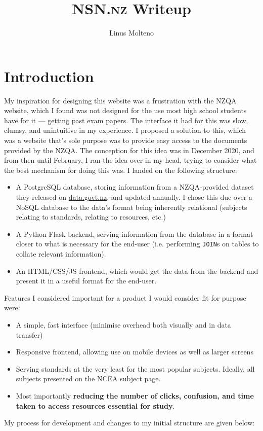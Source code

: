 \documentclass{article}
\title{\textsc{NSN.nz} Writeup}
\author{Linus Molteno}
\date{}
\begin{document}
\maketitle

\section{Introduction}
My inspiration for designing this website was a frustration with the NZQA website, which I found was not designed for the use most high school students have for it --- getting past exam papers. The interface it had for this was slow, clumsy, and unintuitive in my experience. I proposed a solution to this, which was a website that's sole purpose was to provide easy access to the documents provided by the NZQA. The conception for this idea was in December 2020, and from then until February, I ran the idea over in my head, trying to consider what the best mechanism for doing this was. I landed on the following structure:
\begin{itemize}
    \item A PostgreSQL database, storing information from a NZQA-provided dataset they released on \url{data.govt.nz}, and updated annually. I chose this due over a NoSQL database to the data's format being inherently relational (subjects relating to standards, relating to resources, etc.)
    \item A Python Flask backend, serving information from the database in a format closer to what is necessary for the end-user (i.e. performing \texttt{JOIN}s on tables to collate relevant information).
    \item An HTML/CSS/JS frontend, which would get the data from the backend and present it in a useful format for the end-user.
\end{itemize}
Features I considered important for a product I would consider fit for purpose were:
\begin{itemize}
    \item A simple, fast interface (minimise overhead both visually and in data transfer)
    \item Responsive frontend, allowing use on mobile devices as well as larger screens
    \item Serving standards at the very least for the most popular subjects. Ideally, all subjects presented on the NCEA subject page.
    \item Most importantly \textbf{reducing the number of clicks, confusion, and time taken to access resources essential for study}.
\end{itemize}
My process for development and changes to my initial structure are given below:
\end{document}
